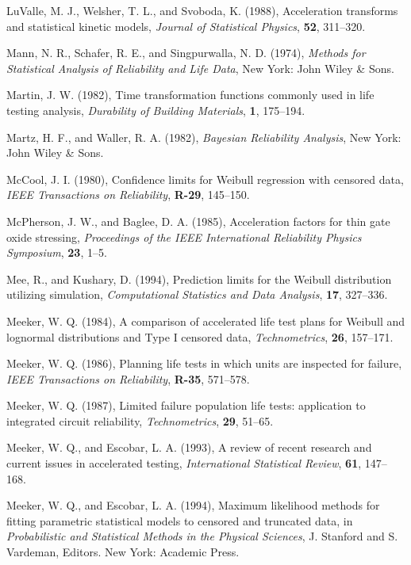 \begin{thebibliography}{999}
LuValle, M. J., Welsher, T. L., and Svoboda, K. (1988),
Acceleration transforms and statistical kinetic models,
{\em Journal of Statistical Physics}, {\bf 52}, 311--320.

Mann, N. R., Schafer, R. E., and Singpurwalla, N. D. (1974), {\em
Methods for Statistical Analysis of Reliability and Life Data}, New
York: John Wiley \& Sons.

Martin, J. W. (1982), Time transformation functions commonly used in
life testing analysis, {\em Durability of Building Materials}, {\bf
1}, 175--194.

Martz, H. F., and Waller, R. A. (1982), {\em Bayesian Reliability
Analysis}, New York: John Wiley \& Sons.

McCool, J. I. (1980), Confidence limits for Weibull regression with
censored data, {\em IEEE Transactions on Reliability}, {\bf R-29},
145--150.

McPherson, J. W.,  and Baglee, D. A. (1985), Acceleration factors for
thin gate oxide stressing, {\em Proceedings of the IEEE International
Reliability Physics Symposium}, {\bf 23}, 1--5.

Mee, R., and Kushary, D. (1994), Prediction limits for the Weibull
distribution utilizing simulation, {\em Computational Statistics and
Data Analysis}, {\bf 17}, 327--336.

Meeker, W. Q. (1984),
A comparison of accelerated life test plans for
Weibull and lognormal distributions and Type I censored data,
{\em Technometrics}, {\bf 26}, 157--171.

Meeker, W. Q. (1986), Planning life tests in which units are inspected
for failure, {\em IEEE Transactions on Reliability}, {\bf R-35},
571--578.

Meeker, W. Q.  (1987), Limited failure population life tests:
application to integrated circuit reliability,  {\em Technometrics},
{\bf 29}, 51--65.

Meeker, W. Q., and Escobar, L. A. (1993), A review of recent research
and current issues in accelerated testing,   {\em International
Statistical Review}, {\bf 61}, 147--168.

Meeker, W. Q., and Escobar, L. A. (1994), Maximum likelihood methods
for fitting parametric statistical models to censored and truncated
data, in {\em Probabilistic and Statistical Methods in the
Physical Sciences},  J. Stanford and S. Vardeman, Editors.
New York: Academic Press.


\end{thebibliography}
